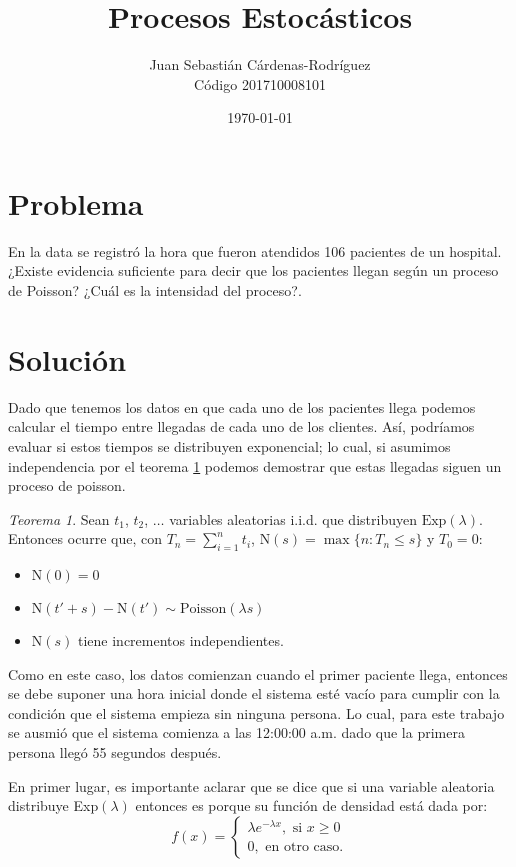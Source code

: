 \documentclass[11pt]{article}
\title{Procesos Estocásticos}
\author{Juan Sebasti\'an C\'ardenas-Rodríguez\\ Código 201710008101 \\ \scalebox{0.7}{Ingeniería Matemática, Universidad EAFIT}}
\date{\today}
\theoremstyle{definition}
\theoremstyle{remark}
\theoremstyle{remark}
\theoremstyle{theorem}
\newtheorem{theorem}{Teorema}
\begin{document}
\maketitle
\section{Problema}
En la data se registró la hora que fueron atendidos 106 pacientes de
un hospital. ¿Existe evidencia suficiente para decir que los pacientes
llegan según un proceso de Poisson? ¿Cuál es la intensidad del
proceso?.

\section{Solución}
Dado que tenemos los datos en que cada uno de los pacientes llega
podemos calcular el tiempo entre llegadas de cada uno de los
clientes. Así, podríamos evaluar si estos tiempos se distribuyen
exponencial; lo cual, si asumimos independencia por el teorema
\ref{theo:1} podemos demostrar que estas llegadas siguen un proceso de
poisson.

\begin{theorem}
  \label{theo:1}
  Sean $t_1$, $t_2$, $\dots$ variables aleatorias i.i.d. que
  distribuyen $\text{Exp}(\lambda)$. Entonces ocurre que, con
  $T_n = \sum_{i=1}^nt_i$, $\text{N}(s)= \max\{n: T_n \le s\}$ y
  $T_0 = 0$:

  \begin{itemize}
  \item $\text{N}(0) = 0$
  \item
    $\text{N}(t' + s) - \text{N}(t') \sim \text{Poisson}(\lambda s)$
  \item $\text{N}(s)$ tiene incrementos independientes.
  \end{itemize}
\end{theorem}

Como en este caso, los datos comienzan cuando el primer paciente
llega, entonces se debe suponer una hora inicial donde el sistema esté
vacío para cumplir con la condición que el sistema empieza sin ninguna
persona. Lo cual, para este trabajo se ausmió que el sistema comienza
a las 12:00:00 a.m. dado que la primera persona llegó 55 segundos
después.

En primer lugar, es importante aclarar que se dice que si una variable
aleatoria distribuye Exp$(\lambda)$ entonces es porque su función de
densidad está dada por:
\begin{equation*}
  f(x) =
  \begin{cases}
    \lambda e^{-\lambda x}, \text{ si } x \ge 0 \\
    0, \text{ en otro caso.}
  \end{cases}
\end{equation*}
\end{document}
